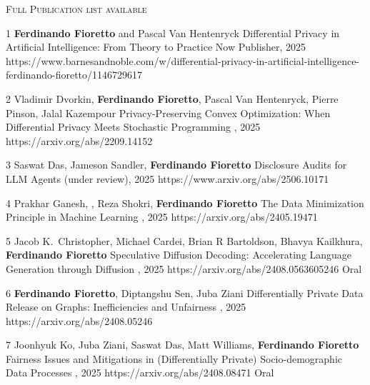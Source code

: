 \documentclass[localFont,alternative]{documentMETADATA}
\begin{document}
{\textsc{Full Publication list available  }}

\begin{pubs}
	
	\confentryShort
	{1}
	{{\bf Ferdinando Fioretto} and Pascal Van Hentenryck}
	{Differential Privacy in Artificial Intelligence: From Theory to Practice}
	{Now Publisher, 2025}
	{https://www.barnesandnoble.com/w/differential-privacy-in-artificial-intelligence-ferdinando-fioretto/1146729617}

	\confentryShort
	{2} 
	{Vladimir Dvorkin, {\bf Ferdinando Fioretto}, Pascal Van Hentenryck, Pierre Pinson, Jalal Kazempour}
	{Privacy-Preserving Convex Optimization: When Differential Privacy Meets Stochastic Programming}
	{, 2025}
	{https://arxiv.org/abs/2209.14152}

	\confentryShort
	{3}
	{{Saswat Das}, {Jameson Sandler}, {\bf Ferdinando Fioretto}}
	{Disclosure Audits for LLM Agents}
	{ (under review), 2025}
	{https://www.arxiv.org/abs/2506.10171}

\confentryShort
	{4}
	{Prakhar Ganesh, , Reza Shokri, {\bf Ferdinando Fioretto}}
	{The Data Minimization Principle in Machine Learning}
	{\procFAccT, 2025}
	{https://arxiv.org/abs/2405.19471}

\confentryShortAwd
	{5}
	{{Jacob K.~Christopher}, {Michael Cardei}, Brian R Bartoldson, Bhavya Kailkhura, {\bf Ferdinando Fioretto}}
	{Speculative Diffusion Decoding: Accelerating Language Generation through Diffusion}
	{\procNAACL, 2025}
	{https://arxiv.org/abs/2408.0563605246}
	{Oral}

\confentryShort
	{6}
	{{\bf Ferdinando Fioretto}, Diptangshu Sen, Juba Ziani}
	{Differentially Private Data Release on Graphs: Inefficiencies and Unfairness}
	{\procAISTATS, 2025}
	{https://arxiv.org/abs/2408.05246}

\confentryShortAwd
	{7}
	{{Joonhyuk Ko}, Juba Ziani, {Saswat Das}, Matt Williams, {\bf Ferdinando Fioretto}}
	{Fairness Issues and Mitigations in (Differentially Private) Socio-demographic Data Processes}
	{\procAAAI, 2025}
	{https://arxiv.org/abs/2408.08471}
	{Oral}



\end{pubs}
\end{document}
